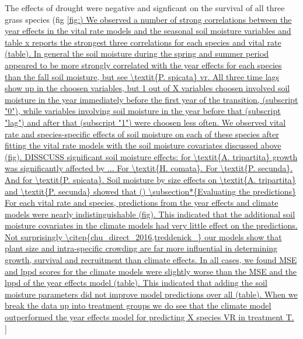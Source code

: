 \documentclass[11pt]{article}
\begin{document}
\begin{doublespacing}
The effects of drought were negative and signficant on the survival of all three grass species (fig \ref{fig:) 

We observed a number of strong correlations between the year effects in the vital rate models and the seasonal soil moisture variables and table x reports the strongest three correlations for each species and vital rate (table). In general the soil moisture during the spring and summer period appeared to be more strongly correlated with the year effects for each species than the fall soil moisture, but see \textit{P. spicata} vr.  All three time lags show up in the choosen variables, but 1 out of X variables choosen involved soil moisture in the year immediately before the first year of the transition, (subscript "0"), while variables involving soil moisture in the year before that (subscript "lag") and after that (subscript "1") were choosen less often.

We observed vital rate and species-specific effects of soil moisture on each of these species after fitting the vital rate models with the soil moisture covariates discussed above (fig). DISSCUSS significant soil moisture effects: for \textit{A. tripartita} growth was significantly affected by ...  For \textit{H. comata}.  For \textit{P. secunda}. And for \textit{P. spicata}. Soil moisture by size effects on \textit{A. tripartita} and \textit{P. secunda} showed that ()

\subsection*{Evaluating the predictions}

For each vital rate and species, predictions from the year effects and climate models were nearly indistinguishable (fig). This indicated that the additional soil moisture covariates in the climate models had very little effect on the predictions. Not surprisingly \citep{chu_direct_2016,treddenick_} our models show that plant size and intra-specific crowding are far more influential in determining growth, survival and recruitment than climate effects.  In all cases, we found MSE and lppd scores for the climate models were slightly worse than the MSE and the lppd of the year effects model (table).  This indicated that adding the soil moisture parameters did not improve model predictions over all (table). When we break the data up into treatment groups we do see that the climate model outperformed the year effects model for predicting X species VR in treatment T.    

}
\end{doublespacing}
\end{document}
